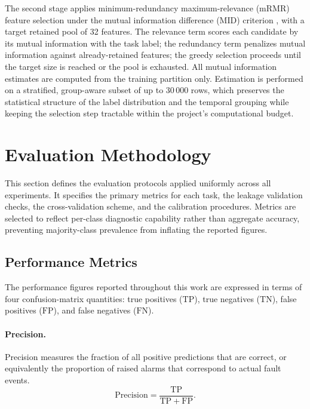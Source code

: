 The second stage applies minimum-redundancy maximum-relevance (mRMR) feature selection under the mutual information difference (MID) criterion \citep{peng2005mrmr}, with a target retained pool of 32 features. The relevance term scores each candidate by its mutual information with the task label; the redundancy term penalizes mutual information against already-retained features; the greedy selection proceeds until the target size is reached or the pool is exhausted. All mutual information estimates are computed from the training partition only. Estimation is performed on a stratified, group-aware subset of up to 30\,000 rows, which preserves the statistical structure of the label distribution and the temporal grouping while keeping the selection step tractable within the project's computational budget.


\section{Evaluation Methodology}
\label{sec:evaluation-methodology}

This section defines the evaluation protocols applied uniformly across all experiments. It specifies the primary metrics for each task, the leakage validation checks, the cross-validation scheme, and the calibration procedures. Metrics are selected to reflect per-class diagnostic capability rather than aggregate accuracy, preventing majority-class prevalence from inflating the reported figures.

\subsection{Performance Metrics}

The performance figures reported throughout this work are expressed in terms of four confusion-matrix quantities: true positives ($\mathrm{TP}$), true negatives ($\mathrm{TN}$), false positives ($\mathrm{FP}$), and false negatives ($\mathrm{FN}$).

\paragraph{Precision.}
Precision measures the fraction of all positive predictions that are correct, or equivalently the proportion of raised alarms that correspond to actual fault events.
\[
  \mathrm{Precision} = \frac{\mathrm{TP}}{\mathrm{TP}+\mathrm{FP}}.
\]


